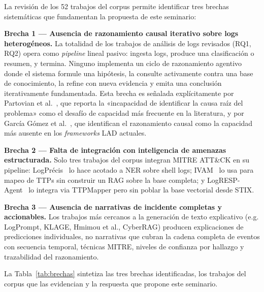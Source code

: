 La revisión de los 52 trabajos del corpus permite identificar tres
brechas sistemáticas que fundamentan la propuesta de este seminario:

\textbf{Brecha 1 — Ausencia de razonamiento causal iterativo sobre logs
heterogéneos.} La totalidad de los trabajos de análisis de logs revisados
(RQ1, RQ2) opera como \textit{pipeline }lineal pasivo: ingesta logs, produce una
clasificación o resumen, y termina. Ninguno implementa un ciclo de
razonamiento agentivo donde el sistema formule una hipótesis, la consulte
activamente contra una base de conocimiento, la refine con nueva evidencia
y emita una conclusión iterativamente fundamentada. Esta brecha es señalada
explícitamente por Partovian et al.~\cite{partovian2024sms}, que reporta
la «incapacidad de identificar la causa raíz del problema» como el desafío
de capacidad más frecuente en la literatura, y por García Gómez et al.~\cite{garcia2026collaborative},
que identifican el razonamiento causal como la capacidad más ausente en
los \textit{frameworks }LAD actuales.

\textbf{Brecha 2 — Falta de integración con inteligencia de amenazas
estructurada.} Solo tres trabajos del corpus integran MITRE ATT\&CK en
su pipeline: LogPrécis~\cite{boffa2024logprecis} lo hace acotado a NER
sobre shell logs; IVAM~\cite{ismail2025ivam} lo usa para mapeo de TTPs
sin construir un RAG sobre la base completa; y LogRESP-Agent~\cite{lee2025logrespagent}
lo integra via TTPMapper pero sin poblar la base vectorial desde STIX.

\textbf{Brecha 3 — Ausencia de narrativas de incidente completas y
accionables.} Los trabajos más cercanos a la generación de texto explicativo
(e.g. LogPrompt, KLAGE, Hmimou et al., CyberRAG) producen explicaciones de
predicciones individuales, no narrativas que cubran la cadena completa de
eventos con
secuencia temporal, técnicas MITRE, niveles de confianza por hallazgo y
trazabilidad del razonamiento.

La Tabla~\ref{tab:brechas} sintetiza las tres brechas identificadas,
los trabajos del corpus que las evidencian y la respuesta que propone
este seminario.

